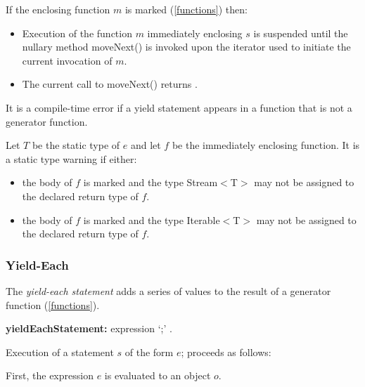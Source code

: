 \documentclass{article}
\newcommand{\code}[1]{{\sf #1}}
\begin{document}
\LMHash{}
If the enclosing function $m$ is marked \SYNC* (\ref{functions}) then:
\begin{itemize}
\item
Execution of the function $m$ immediately enclosing $s$ is suspended until the nullary method \code{moveNext()} is invoked upon the iterator used to initiate the current invocation of $m$.
\item
The current call to \code{moveNext()} returns \TRUE.
\end{itemize}

\LMHash{}
It is a compile-time error if a yield statement appears in a function that is not a generator function.

\LMHash{}
Let $T$ be the static type of $e$ and let $f$ be the immediately enclosing function.  It is a static type warning if either:
\begin{itemize}
\item
 the body of $f$ is marked \ASYNC* and the type \code{Stream$<$T$>$} may not be assigned to the declared return type of $f$.
 \item
 the body of $f$ is marked \SYNC* and the type \code{Iterable$<$T$>$} may not be assigned to the declared return type of $f$.
 \end{itemize}


 \subsubsection{ Yield-Each}

\LMHash{}
 The {\em yield-each statement} adds a series of values to the result of a generator function (\ref{functions}).

 \begin{grammar}
{\bf yieldEachStatement:}
   \YIELD* expression `{\escapegrammar ;}'
      .
\end{grammar}

\LMHash{}
Execution of a statement $s$ of the form \code{\YIELD* $e$;}  proceeds as follows:

\LMHash{}
First, the expression $e$ is evaluated to an object $o$.
\end{document}

